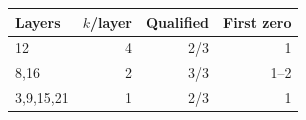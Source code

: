 \begin{tabular}{lrrr}
\toprule
Layers & $k$/layer & Qualified & First zero \\
\midrule
12 & 4 & 2/3 & 1 \\
8,16 & 2 & 3/3 & 1--2 \\
3,9,15,21 & 1 & 2/3 & 1 \\
\bottomrule
\end{tabular}
